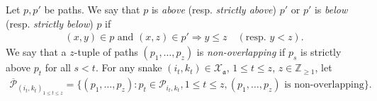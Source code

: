 \documentclass[12pt, reqno]{amsart}
\numberwithin{equation}{section}
\begin{document}
{Let $p,p'$ be paths. We say that $p$ is \textit{above} (resp. \textit{strictly above}) $p'$ or $p'$ is \textit{below} (resp. \textit{strictly below}) $p$ if
\begin{align*}
(x,y)\in p \text{ and } (x,z)\in p' \Longrightarrow y \leq z \quad (\text{resp. } y<z).
\end{align*}
We say that a $z$-tuple of paths $(p_{1},\ldots,p_{z})$ is \textit{non-overlapping} if $p_{s}$ is strictly above $p_{t}$ for all $s<t$. For any snake $(i_{t},k_{t})\in \mathcal{X}_{\mathfrak{a}}$, $1\leq t\leq z$, $z\in \mathbb{Z}_{\geq1}$, let
\begin{align}\label{Non-overlapping paths}
\overline{\mathscr{P}}_{(i_{t},k_{t})_{1\leq t\leq z}}=\{(p_{1},\ldots,p_{z}): p_{t}\in \mathscr{P}_{i_{t},k_{t}}, 1\leq t\leq z, (p_{1},\ldots,p_{z})\text{ is } \text {non-overlapping}\}.
\end{align}

}
\end{document}
